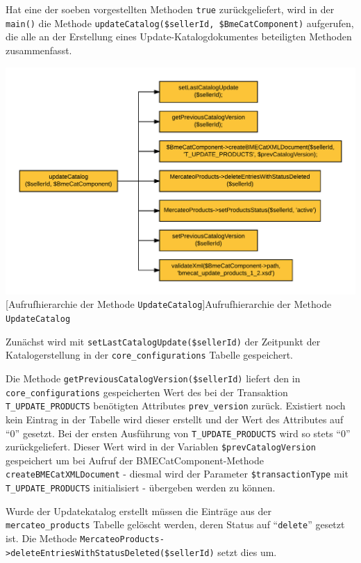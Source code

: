 {	Hat eine der soeben vorgestellten Methoden \texttt{true} zurückgeliefert, wird in der \texttt{main()} die Methode \texttt{updateCatalog(\$sellerId, \$BmeCatComponent)} aufgerufen, die alle an der Erstellung eines Update-Katalogdokumentes beteiligten Methoden zusammenfasst.
	
	\begin{minipage}{\linewidth}
		\vspace{1em}
		\centering
		\includegraphics[width=0.7 \linewidth]{img/updateKatalogAufrufhierarchie}
		[Aufrufhierarchie der Methode \texttt{UpdateCatalog}]{Aufrufhierarchie der Methode \texttt{UpdateCatalog}}
		\vspace{1em}
	\end{minipage}
	
	Zunächst wird mit \texttt{setLastCatalogUpdate(\$sellerId)} der Zeitpunkt der Katalogerstellung in der \texttt{core\_configurations} Tabelle gespeichert.  
	
	Die Methode \texttt{getPreviousCatalogVersion(\$sellerId)} liefert den in \texttt{core\_configurations} gespeicherten Wert des bei der Transaktion \texttt{T\_UPDATE\_PRODUCTS} benötigten Attributes \texttt{prev\_version} zurück. Existiert noch kein Eintrag in der Tabelle wird dieser erstellt und der Wert des Attributes auf \enquote{0} gesetzt. Bei der ersten Ausführung von \texttt{T\_UPDATE\_PRODUCTS} wird so stets \enquote{0} zurückgeliefert. Dieser Wert wird in der Variablen \texttt{\$prevCatalogVersion} gespeichert um bei Aufruf der BMECatComponent-Methode \texttt{createBMECatXMLDocument} - diesmal wird der Parameter \texttt{\$transactionType} mit \texttt{T\_UPDATE\_PRODUCTS} initialisiert - übergeben werden zu können.
	
	Wurde der Updatekatalog erstellt müssen die Einträge aus der \texttt{mercateo\_products} Tabelle gelöscht werden, deren Status auf \enquote{\texttt{delete}} gesetzt ist. Die Methode \texttt{MercateoProducts->deleteEntries\-WithStatusDeleted(\$sellerId)} setzt dies um.
	
}
